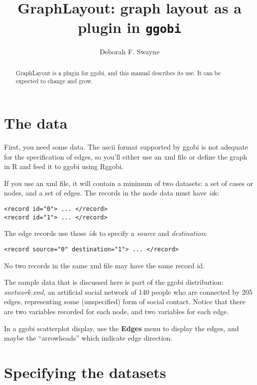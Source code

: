 \documentclass[11pt]{article}
\def\file#1{\textsl{#1}}
\def\XMLAttribute#1{\textsl{#1}}
\begin{document}
\title{GraphLayout: graph layout as a plugin in {\tt ggobi}}
\author{Deborah F. Swayne}
\maketitle

\begin{abstract}
GraphLayout is a plugin for ggobi, and this manual
describes its use.  It can be expected to change and grow.
\end{abstract}

\section{The data}

First, you need some data.  The ascii format supported by ggobi is not
adequate for the specification of edges, so you'll either use an xml
file or define the graph in R and feed it to ggobi using Rggobi.

If you use an xml file, it will contain a minimum of two datasets: a
set of cases or nodes, and a set of edges.  The records in the node
data must have \XMLAttribute{id}s:

\begin{verbatim}
<record id="0"> ... </record>
<record id="1"> ... </record>
\end{verbatim}

The edge records use those \XMLAttribute{id}s to specify a
\XMLAttribute{source} and \XMLAttribute{destination}:

\begin{verbatim}
<record source="0" destination="1"> ... </record>
\end{verbatim}

No two records in the same xml file may have the same record id.

The sample data that is discussed here is part of the ggobi distribution:
\file{snetwork.xml}, an artificial social network of 140 people who are
connected by 205 edges, representing some (unspecified) form of social
contact.  Notice that there are two variables recorded for each node,
and two variables for each edge.

In a ggobi scatterplot display, use the {\bf Edges} menu to
display the edges, and maybe the ``arrowheads'' which indicate
edge direction.

\section{Specifying the datasets}
\end{document}
